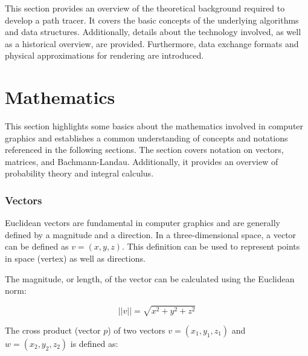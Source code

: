 \label{ch:theory}

This section provides an overview of the theoretical background required to develop a path tracer. It covers the basic concepts of the underlying algorithms and data structures. Additionally, details about the technology involved, as well as a historical overview, are provided. Furthermore, data exchange formats and physical approximations for rendering are introduced.

\section{Mathematics}

This section highlights some basics about the mathematics involved in computer graphics and establishes a common understanding of concepts and notations referenced in the following sections. The section covers notation on vectors, matrices, and Bachmann-Landau. Additionally, it provides an overview of probability theory and integral calculus.

\subsubsection{Vectors}

Euclidean vectors are fundamental in computer graphics and are generally defined by a magnitude and a direction. In a three-dimensional space, a vector can be defined as $v = (x, y, z)$. This definition can be used to represent points in space (vertex) as well as directions.

The magnitude, or length, of the vector can be calculated using the Euclidean norm:

\begin{equation}
  \label{eqn:euclidean-norm}
  ||v|| = \sqrt{x^2 + y^2 + z^2}
\end{equation}



The cross product (vector $p$) of two vectors $v = (x_1, y_1, z_1)$ and $w = (x_2, y_2, z_2)$ is defined as:

